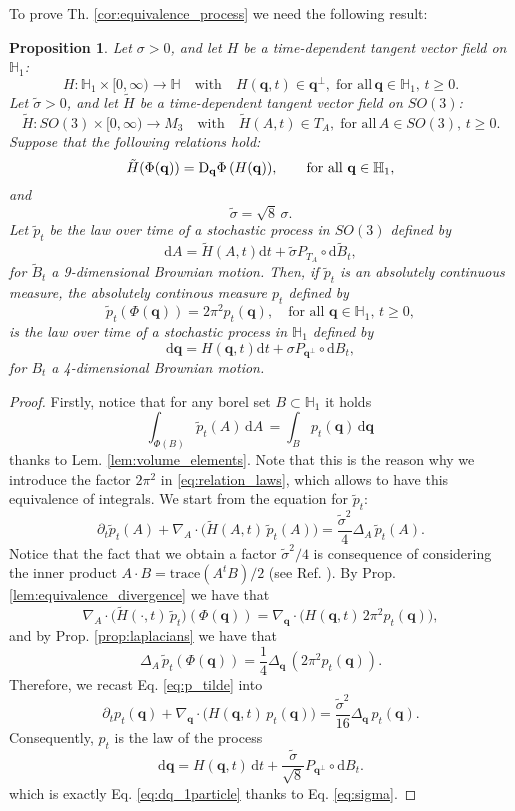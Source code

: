 \documentclass[12pt]{article}
\def\to{\rightarrow}
\newtheorem{proposition}[theorem]{Proposition}
\newcommand{\be}{\begin{equation}}
\newcommand{\ee}{\end{equation}}
\newcommand{\ud}{\mathrm{d}}
\newcommand{\unitq}{{\mathbb{H}_1}}
\newcommand{\q}{\mathbf{q}}
\begin{document}
To prove Th. \ref{cor:equivalence_process} we need the following result:
\begin{proposition}
\label{prop:stochastic_equivalence} Let $\sigma>0$, and let $H$ be a time-dependent tangent vector field on $\unitq$:
$$H:\unitq\times [0,\infty) \to \mathbb{H} \quad \text{with} \quad H(\q,t) \in \q^\perp, \; \text{for all}\, \q\in\unitq,\,t\ge0.$$
Let $\tilde \sigma>0$, and let $\tilde H$ be a time-dependent tangent vector field on $SO(3)$:
 $$\tilde H:SO(3)\times [0,\infty) \to M_3 \quad \text{with} \quad \tilde H(A,t) \in T_A, \; \text{for all}\, A\in SO(3),\,t\ge0.$$
Suppose that the following relations hold:
\be \label{eq:PTA_PTq0}
\tilde H (\Phi(\q)) = \textnormal{D}_\q \Phi \, (H(\q)), \qquad\mbox{for all } \q\in \unitq,
\ee
 and 
\be \label{eq:sigma} 
\tilde \sigma = \sqrt{8} \, \sigma.
\ee
Let $\tilde p_t$ be the law over time of a stochastic process in $SO(3)$ defined by
$$\ud A=\tilde H(A,t) \ud t +\tilde \sigma P_{T_A}\circ \ud\tilde B_t,$$
for $\tilde B_t$ a 9-dimensional Brownian motion.
Then, if $\tilde p_t$ is an absolutely continuous measure, the absolutely continous measure $p_t$ defined by
\be \label{eq:relation_laws}
\tilde p_t(\Phi(\q))=2\pi^2 p_t(\q), \quad\mbox{for all } \q\in \unitq,\, t\ge0,
\ee
is the law over time of a stochastic process in $\unitq$ defined by
\be \label{eq:dq_1particle}
\ud\q = H(\q,t) \ud t + \sigma P_{\q^\perp}\circ \ud B_t,
\ee
for $B_t$ a 4-dimensional Brownian motion.
\end{proposition}
\begin{proof}
Firstly, notice that for any borel set $B\subset \unitq$ it holds
$$
\int_{\Phi(B)} \tilde p_t(A)\,\ud A\, = \int_B  p_t(\q)\,\ud\q\,
$$
thanks to Lem. \ref{lem:volume_elements}. Note that this is the reason why we introduce the factor $2\pi^2$ in \eqref{eq:relation_laws}, which allows to have this equivalence of integrals. 
We start from the equation for $\tilde p_t$:
\be \label{eq:p_tilde}
\partial_t \tilde p_t(A) + \nabla_A\cdot \big( \tilde H(A,t) \, \tilde p_t (A)\big) = \frac{\tilde \sigma^2}{4}\Delta_A \,\tilde p_t(A).
\ee
Notice that the fact that we obtain a factor $\tilde \sigma^2/4$ is consequence of considering the inner product $A\cdot B = \mbox{trace}(A^tB)/2$ (see Ref. \cite{bodyattitude}).
By Prop. \ref{lem:equivalence_divergence} we have that
$$\nabla_A\cdot \big(\tilde H(\cdot,t) \, \tilde p_t\big)(\Phi(\q))= \nabla_\q \cdot\big(H(\q,t)\, 2\pi^2 p_t(\q)\big),$$
and by Prop. \ref{prop:laplacians} we have that
$$\Delta_A \,\tilde p_t (\Phi(\q)) = \frac{1}{4} \Delta_\q \,(2\pi^2p_t(\q)).$$
Therefore, we recast Eq. \eqref{eq:p_tilde} into
$$\partial_t p_t(\q)  + \nabla_\q \cdot \big(H(\q,t)\,  p_t(\q)\big) = \frac{\tilde \sigma^2}{16}\Delta_\q \,p_t(\q).$$
Consequently, $p_t$ is the law of the process
$$\ud\q = H(\q,t)\, \ud t + \frac{\tilde \sigma}{\sqrt{8}} P_{\q^\perp} \circ \ud B_t.$$
which is exactly Eq. \eqref{eq:dq_1particle} thanks to Eq. \eqref{eq:sigma}.
\end{proof}
\end{document}
